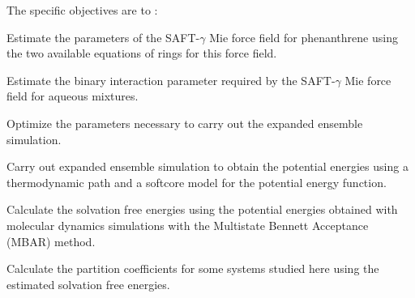 The specific objectives are to :

\begin{description}[1.5cm]
	\item[$\bullet$] Estimate the parameters of the SAFT-$\gamma$ Mie force field for phenanthrene using the two available equations of rings for this force field. 
	\item[$\bullet$] Estimate the binary interaction parameter required by the SAFT-$\gamma$ Mie force field for aqueous mixtures.
	\item[$\bullet$] Optimize the parameters necessary to carry out the expanded ensemble simulation.
	\item[$\bullet$] Carry out expanded ensemble simulation to obtain the potential energies using  a thermodynamic path and a softcore model for the potential energy function.
	\item[$\bullet$] Calculate the solvation free energies using the potential energies obtained with molecular dynamics simulations with the Multistate Bennett Acceptance (MBAR) method.
	\item[$\bullet$] Calculate the partition coefficients for some systems studied here using the estimated solvation free energies.
\end{description}
